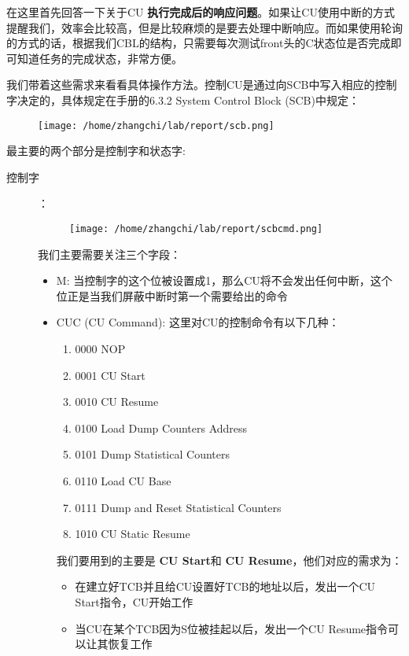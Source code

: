 \documentclass{article}
\newcommand{\highlight}[1]{{\bfseries \color{red}  #1}}
\begin{document}
\begin{CJK*}{UTF8}{gkai}
在这里首先回答一下关于CU\highlight{执行完成后的响应问题}。如果让CU使用中断的方式提醒我们，效率会比较高，但是比较麻烦的是要去处理中断响应。而如果使用轮询的方式的话，根据我们CBL的结构，只需要每次测试front头的C状态位是否完成即可知道任务的完成状态，非常方便。

\label{scb}

我们带着这些需求来看看具体操作方法。控制CU是通过向SCB中写入相应的控制字决定的，具体规定在手册的6.3.2 System Control Block (SCB)中规定：

\begin{figure}[htp]
\centering
\texttt{[image: /home/zhangchi/lab/report/scb.png]}
\end{figure}

最主要的两个部分是控制字和状态字:

\begin{description}
\item[控制字]：\\
\begin{figure}[htp]
\centering
\texttt{[image: /home/zhangchi/lab/report/scbcmd.png]}
\end{figure}

我们主要需要关注三个字段：

\begin{itemize}
\item{M: 当控制字的这个位被设置成1，那么CU将不会发出任何中断，这个位正是当我们屏蔽中断时第一个需要给出的命令}
\item{CUC (CU Command): 这里对CU的控制命令有以下几种：

\begin{enumerate}
\item{0000 NOP}
\item{0001 CU Start}
\item{0010 CU Resume}
\item{0100 Load Dump Counters Address}
\item{0101 Dump Statistical Counters}
\item{0110 Load CU Base}
\item{0111 Dump and Reset Statistical Counters}
\item{1010 CU Static Resume} 
\end{enumerate}

我们要用到的主要是\highlight{CU Start}和\highlight{CU Resume}，他们对应的需求为：

\begin{itemize}
\item{在建立好TCB并且给CU设置好TCB的地址以后，发出一个CU Start指令，CU开始工作}
\item{当CU在某个TCB因为S位被挂起以后，发出一个CU Resume指令可以让其恢复工作}
\end{itemize}

}
\end{itemize}
\end{description}
\end{CJK*}
\end{document}
